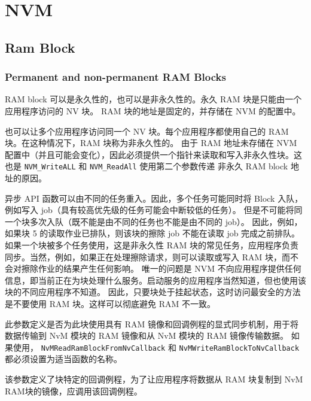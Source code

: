 \section{NVM}
\subsection{Ram Block}
\subsubsection{Permanent and non-permanent RAM Blocks}
RAM block 可以是永久性的，也可以是非永久性的。永久 RAM 块是只能由一个应用程序访问的 NV 块。 RAM 块的地址是固定的，并存储在 NVM 的配置中。

也可以让多个应用程序访问同一个 NV 块。每个应用程序都使用自己的 RAM 块。在这种情况下，RAM 块称为非永久性的。
由于 RAM 地址未存储在 NVM 配置中（并且可能会变化），因此必须提供一个指针来读取和写入非永久性块。这也是 \lstinline{NVM_WriteALL} 和 \lstinline{NVM_ReadAll} 使用第二个参数传递
非永久 RAM block 地址的原因。

\begin{remark}
异步 API 函数可以由不同的任务重入。因此，多个任务可能同时将 Block 入队，例如写入 job（具有较高优先级的任务可能会中断较低的任务）。
但是不可能将同一个块多次入队（既不能是由不同的任务也不能是由不同的 job）。
因此，例如，如果块 5 的读取作业已排队，则该块的擦除 job 不能在读取 job 完成之前排队。
如果一个块被多个任务使用，这是非永久性 RAM 块的常见任务，应用程序负责同步。当然，例如，如果正在处理擦除请求，则可以读取或写入 RAM 块，而不会对擦除作业的结果产生任何影响。
唯一的问题是 NVM 不向应用程序提供任何信息，即当前正在为块处理什么服务。启动服务的应用程序当然知道，但也使用该块的不同应用程序不知道。
因此，只要块处于挂起状态，这时访问最安全的方法是不要使用 RAM 块。这样可以彻底避免 RAM 不一致。
\end{remark}

\begin{definition}
此参数定义是否为此块使用具有 RAM 镜像和回调例程的显式同步机制，用于将数据传输到 NvM 模块的 RAM 镜像和从 NvM 模块的 RAM 镜像传输数据。
如果使用， \lstinline{NvMReadRamBlockFromNvCallback} 和 \lstinline{NvMWriteRamBlockToNvCallback} 都必须设置为适当函数的名称。
\end{definition}
\begin{definition}
  该参数定义了块特定的回调例程，为了让应用程序将数据从 RAM 块复制到 NvM RAM块的镜像，应调用该回调例程。
\end{definition}

